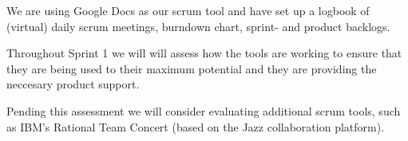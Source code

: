 \documentclass[a4paper,11pt]{article}
\begin{document}
We are using Google Docs as our scrum tool and have set up a logbook of (virtual) daily scrum meetings, burndown chart, sprint- and product backlogs.

Throughout Sprint 1 we will will assess how the tools are working to ensure that they are being used to their maximum potential and they are providing the neccesary product support.

Pending this assessment we will consider evaluating additional scrum tools, such as IBM's Rational Team Concert (based on the Jazz collaboration platform).

\end{document}
